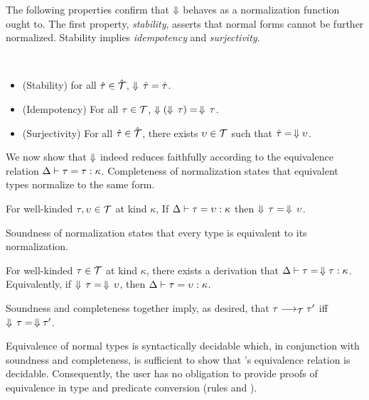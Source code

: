 \documentclass[authoryear, acmsmall, screen, review, nonacm]{acmart} %
\begin{document}
The following properties confirm that $\Downarrow$ behaves as a normalization function ought to. The first property, \emph{stability}, asserts that normal forms cannot be further normalized. Stability implies \emph{idempotency} and \emph{surjectivity}.

\begin{theorem} ~
  \begin{itemize}
  \item (Stability) for all $\hat{\tau} \in \hat{{\mathcal T}}$, $\Downarrow \, \hat{\tau} = \hat{\tau}$.
  \item (Idempotency) For all $\tau \in {\mathcal T}$, $ \Downarrow (\Downarrow \, \tau) =\, \Downarrow \, \tau$.
  \item (Surjectivity) For all $\hat{\tau} \in \hat{{\mathcal T}}$, there exists $\upsilon \in {\mathcal T}$ such that $\hat{\tau} =\, \Downarrow \upsilon$.
  \end{itemize}
\end{theorem}

We now show that $\Downarrow$ indeed reduces faithfully according to the equivalence relation $\Delta \vdash \tau = \tau : \kappa$. Completeness of normalization states that equivalent types normalize to the same form.

\begin{theorem}[Completeness]
For well-kinded $\tau , \upsilon \in {\mathcal T}$ at kind $\kappa$, If $\Delta \vdash \tau = \upsilon : \kappa$ then $\Downarrow\, \tau = \, \Downarrow \, \upsilon$.
\end{theorem}

\Ni Soundness of normalization states that every type is equivalent to its normalization.

\begin{theorem}[Soundness]
For well-kinded $\tau \in {\mathcal T}$ at kind $\kappa$, there exists a derivation that $\Delta \vdash \tau = \,\Downarrow \tau : \kappa$. Equivalently, if $\Downarrow\, \tau =\, \Downarrow\, \upsilon$, then $\Delta \vdash \tau = \upsilon : \kappa$.
\end{theorem}
\Ni Soundness and completeness together imply, as desired, that $\tau \longrightarrow_{\mathcal T} \tau'$ iff $\Downarrow\, \tau =\, \Downarrow \tau'$.

Equivalence of normal types is syntactically decidable which, in conjunction with soundness and completeness, is sufficient to show that \Rome's equivalence relation is decidable. Consequently, the user has no obligation to provide proofs of equivalence in type and predicate conversion (rules  and ).
\end{document}

